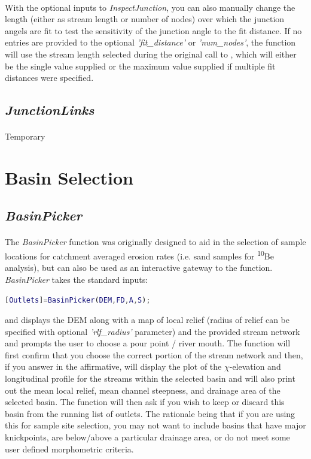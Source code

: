\paragraph{}With the optional inputs to \textit{InspectJunction}, you can also manually change the length (either as stream length or number of nodes) over which the junction angels are fit to test the sensitivity of the junction angle to the fit distance. If no entries are provided to the optional \textit{'fit\_distance'} or \textit{'num\_nodes'}, the function will use the stream length selected during the original call to , which will either be the single value supplied or the maximum value supplied if multiple fit distances were specified.

\subsection{\textit{JunctionLinks}}
\paragraph{}Temporary

\section{Basin Selection}

\subsection{\textit{BasinPicker}} \label{sec:BsnPckr}
\paragraph{}The \textit{BasinPicker} function was originally designed to aid in the selection of sample locations for catchment averaged erosion rates (i.e. sand samples for  \textsuperscript{10}Be analysis), but can also be used as an interactive gateway to the  function. \textit{BasinPicker} takes the standard inputs:

\begin{lstlisting}[language=Matlab]
[Outlets]=BasinPicker(DEM,FD,A,S);
\end{lstlisting}

\noindent
 and displays the DEM along with a map of local relief (radius of relief can be specified with optional \textit{'rlf\_radius'} parameter) and the provided stream network and prompts the user to choose a pour point / river mouth. The function will first confirm that you choose the correct portion of the stream network and then, if you answer in the affirmative, will display the plot of the $\chi$-elevation and longitudinal profile for the streams within the selected basin and will also print out the mean local relief, mean channel steepness, and drainage area of the selected basin. The function will then ask if you wish to keep or discard this basin from the running list of outlets. The rationale being that if you are using this for sample site selection, you may not want to include basins that have major knickpoints, are below/above a particular drainage area, or do not meet some user defined morphometric criteria. 

